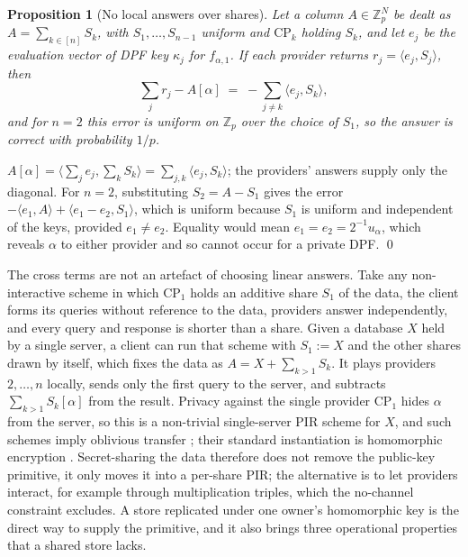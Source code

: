 \documentclass[a4paper,fleqn]{cas-sc}
\newtheorem{proposition}{Proposition}
\begin{document}
\begin{proposition}[No local answers over shares]
\label{prop:nolocal}
Let a column $A\in\mathbb{Z}_p^N$ be dealt as $A=\sum_{k\in[n]}S_k$, with
$S_1,\dots,S_{n-1}$ uniform and $\text{CP}_k$ holding $S_k$, and let $e_j$ be
the evaluation vector of DPF key $\kappa_j$ for $f_{\alpha,1}$. If each
provider returns $r_j=\langle e_j,S_j\rangle$, then
\[
\textstyle\sum_{j} r_j - A[\alpha] \;=\; -\sum_{j\neq k}\langle e_j,S_k\rangle ,
\]
and for $n=2$ this error is uniform on $\mathbb{Z}_p$ over the choice of
$S_1$, so the answer is correct with probability $1/p$.
\end{proposition}
\begin{pf}
$A[\alpha]=\langle\sum_j e_j,\sum_k S_k\rangle=\sum_{j,k}\langle e_j,S_k\rangle$;
the providers' answers supply only the diagonal. For $n=2$, substituting
$S_2=A-S_1$ gives the error $-\langle e_1,A\rangle+\langle e_1-e_2,S_1\rangle$,
which is uniform because $S_1$ is uniform and independent of the keys, provided
$e_1\neq e_2$. Equality would mean $e_1=e_2=2^{-1}u_\alpha$, which reveals
$\alpha$ to either provider and so cannot occur for a private DPF. \qed
\end{pf}

The cross terms are not an artefact of choosing linear answers. Take any
non-interactive scheme in which $\text{CP}_1$ holds an additive share $S_1$ of
the data, the client forms its queries without reference to the data,
providers answer independently, and every query and response is shorter than a
share. Given a database $X$ held by a single server, a client
can run that scheme with $S_1:=X$ and the other shares drawn by itself, which
fixes the data as $A=X+\sum_{k>1}S_k$. It plays providers $2,\dots,n$ locally,
sends only the first query to the server, and subtracts $\sum_{k>1}S_k[\alpha]$
from the result. Privacy against the single provider $\text{CP}_1$ hides
$\alpha$ from the server, so this is a non-trivial single-server PIR scheme for
$X$, and such schemes imply oblivious transfer \citep{dicrescenzo2000single};
their standard instantiation is homomorphic encryption
\citep{kushilevitz1997replication}. Secret-sharing the data therefore does not
remove the public-key primitive, it only moves it into a per-share PIR; the
alternative is to let providers interact, for example through multiplication
triples, which the no-channel constraint excludes. A store replicated under one
owner's homomorphic key is the direct way to supply the primitive, and it also
brings three operational properties that a shared store lacks.
\end{document}
